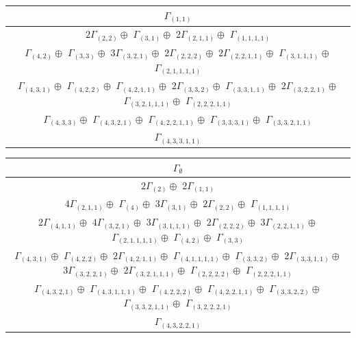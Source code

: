 \documentclass[main.tex]{subfiles}
\begin{document}
\begin{minipage}{1\textwidth}
\centering
\begin{tabular}{c}
$\Gamma_{(
1 , 
1
)}$
\\ \hline
$ 2 \Gamma_{(
2 , 
2
)} \oplus$
$\Gamma_{(
3 , 
1
)} \oplus$
$ 2 \Gamma_{(
2 , 
1 , 
1
)} \oplus$
$\Gamma_{(
1 , 
1 , 
1 , 
1
)}$
\\ \hline
$\Gamma_{(
4 , 
2
)} \oplus$
$\Gamma_{(
3 , 
3
)} \oplus$
$ 3 \Gamma_{(
3 , 
2 , 
1
)} \oplus$
$ 2 \Gamma_{(
2 , 
2 , 
2
)} \oplus$
$ 2 \Gamma_{(
2 , 
2 , 
1 , 
1
)} \oplus$
$\Gamma_{(
3 , 
1 , 
1 , 
1
)} \oplus$
$\Gamma_{(
2 , 
1 , 
1 , 
1 , 
1
)}$
\\ \hline
$\Gamma_{(
4 , 
3 , 
1
)} \oplus$
$\Gamma_{(
4 , 
2 , 
2
)} \oplus$
$\Gamma_{(
4 , 
2 , 
1 , 
1
)} \oplus$
$ 2 \Gamma_{(
3 , 
3 , 
2
)} \oplus$
$\Gamma_{(
3 , 
3 , 
1 , 
1
)} \oplus$
$ 2 \Gamma_{(
3 , 
2 , 
2 , 
1
)} \oplus$
$\Gamma_{(
3 , 
2 , 
1 , 
1 , 
1
)} \oplus$
$\Gamma_{(
2 , 
2 , 
2 , 
1 , 
1
)}$
\\ \hline
$\Gamma_{(
4 , 
3 , 
3
)} \oplus$
$\Gamma_{(
4 , 
3 , 
2 , 
1
)} \oplus$
$\Gamma_{(
4 , 
2 , 
2 , 
1 , 
1
)} \oplus$
$\Gamma_{(
3 , 
3 , 
3 , 
1
)} \oplus$
$\Gamma_{(
3 , 
3 , 
2 , 
1 , 
1
)}$
\\ \hline
$\Gamma_{(
4 , 
3 , 
3 , 
1 , 
1
)}$
\\
\end{tabular}\end{minipage}
\bigskip
\begin{minipage}{1\textwidth}
\centering
\begin{tabular}{c}
$\Gamma_\emptyset$
\\ \hline
$ 2 \Gamma_{(
2
)} \oplus$
$ 2 \Gamma_{(
1 , 
1
)}$
\\ \hline
$ 4 \Gamma_{(
2 , 
1 , 
1
)} \oplus$
$\Gamma_{(
4
)} \oplus$
$ 3 \Gamma_{(
3 , 
1
)} \oplus$
$ 2 \Gamma_{(
2 , 
2
)} \oplus$
$\Gamma_{(
1 , 
1 , 
1 , 
1
)}$
\\ \hline
$ 2 \Gamma_{(
4 , 
1 , 
1
)} \oplus$
$ 4 \Gamma_{(
3 , 
2 , 
1
)} \oplus$
$ 3 \Gamma_{(
3 , 
1 , 
1 , 
1
)} \oplus$
$ 2 \Gamma_{(
2 , 
2 , 
2
)} \oplus$
$ 3 \Gamma_{(
2 , 
2 , 
1 , 
1
)} \oplus$
$\Gamma_{(
2 , 
1 , 
1 , 
1 , 
1
)} \oplus$
$\Gamma_{(
4 , 
2
)} \oplus$
$\Gamma_{(
3 , 
3
)}$
\\ \hline
$\Gamma_{(
4 , 
3 , 
1
)} \oplus$
$\Gamma_{(
4 , 
2 , 
2
)} \oplus$
$ 2 \Gamma_{(
4 , 
2 , 
1 , 
1
)} \oplus$
$\Gamma_{(
4 , 
1 , 
1 , 
1 , 
1
)} \oplus$
$\Gamma_{(
3 , 
3 , 
2
)} \oplus$
$ 2 \Gamma_{(
3 , 
3 , 
1 , 
1
)} \oplus$
$ 3 \Gamma_{(
3 , 
2 , 
2 , 
1
)} \oplus$
$ 2 \Gamma_{(
3 , 
2 , 
1 , 
1 , 
1
)} \oplus$
$\Gamma_{(
2 , 
2 , 
2 , 
2
)} \oplus$
$\Gamma_{(
2 , 
2 , 
2 , 
1 , 
1
)}$
\\ \hline
$\Gamma_{(
4 , 
3 , 
2 , 
1
)} \oplus$
$\Gamma_{(
4 , 
3 , 
1 , 
1 , 
1
)} \oplus$
$\Gamma_{(
4 , 
2 , 
2 , 
2
)} \oplus$
$\Gamma_{(
4 , 
2 , 
2 , 
1 , 
1
)} \oplus$
$\Gamma_{(
3 , 
3 , 
2 , 
2
)} \oplus$
$\Gamma_{(
3 , 
3 , 
2 , 
1 , 
1
)} \oplus$
$\Gamma_{(
3 , 
2 , 
2 , 
2 , 
1
)}$
\\ \hline
$\Gamma_{(
4 , 
3 , 
2 , 
2 , 
1
)}$
\\
\end{tabular}\end{minipage}
\end{document}
